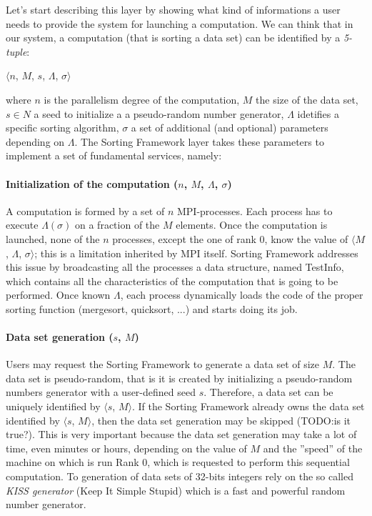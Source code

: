 \label{sort-fram}
Let's start describing this layer by showing what kind of informations a user needs to provide the system for launching a computation. We can think that in our system, a computation (that is sorting a data set) can be identified by a \textit{5-tuple}:
\begin{center}
$\langle n$, $M$, $s$, $\Lambda$, $\sigma \rangle$
\end{center} 
where $n$ is the parallelism degree of the computation, $M$ the size of the data set, $s \in N$ a seed to initialize a a pseudo-random number generator, $\Lambda$ idetifies a specific sorting algorithm, $\sigma$ a set of additional (and optional) parameters depending on $\Lambda$.
The Sorting Framework layer takes these parameters to implement a set of fundamental services, namely: 

\paragraph{Initialization of the computation ($n$, $M$, $\Lambda$, $\sigma$)} A computation is formed by a set of $n$ MPI-processes. Each process has to execute $\Lambda(\sigma)$ on a fraction of the $M$ elements. Once the computation is launched, none of the $n$ processes, except the one of rank $0$, know the value of $\langle M$, $\Lambda$, $\sigma \rangle$; this is a limitation inherited by MPI itself. Sorting Framework addresses this issue by broadcasting all the processes a data structure, named TestInfo, which contains all the characteristics of the computation that is going to be performed. Once known $\Lambda$, each process dynamically loads the code of the proper sorting function (mergesort, quicksort, ...) and starts doing its job.  

\paragraph{Data set generation ($s$, $M$)} Users may request the Sorting Framework to generate a data set of size $M$. The data set is pseudo-random, that is it is created by initializing a pseudo-random numbers generator with a user-defined seed $s$. Therefore, a data set can be uniquely identified by $\langle s$, $M \rangle$. If the Sorting Framework already owns the data set identified by $\langle s$, $M \rangle$, then the data set generation may be skipped (TODO:is it true?). This is very important because the data set generation may take a lot of time, even minutes or hours, depending on the value of $M$ and the ''speed'' of the machine on which is run Rank $0$, which is requested to perform this sequential computation. To generation of data sets of 32-bits integers rely on the so called \textit{KISS generator} (Keep It Simple Stupid) which is a fast and powerful random number generator.

